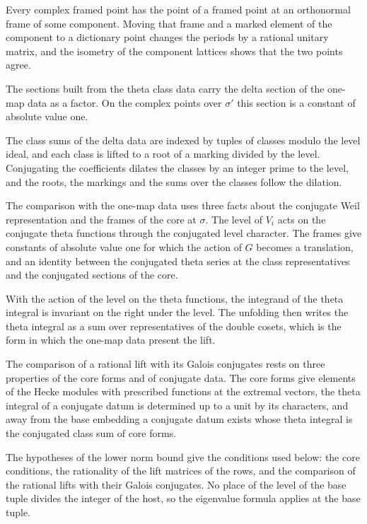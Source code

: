 Every complex framed point has the point of a framed point at an orthonormal frame of some component. Moving that
frame and a marked element of the component to a dictionary point changes the periods by a rational unitary matrix,
and the isometry of the component lattices shows that the two points agree.

The sections built from the theta class data carry the delta section of the one-map data as a factor. On
the complex points over $\sigma'$ this section is a constant of absolute value one.

The class sums of the delta data are indexed by tuples of classes modulo the level ideal, and each class is lifted to a
root of a marking divided by the level. Conjugating the coefficients dilates the classes by an integer prime to the
level, and the roots, the markings and the sums over the classes follow the dilation.

The comparison with the one-map data uses three facts about the conjugate Weil representation and the
frames of the core at $\sigma$. The level of $V_i$ acts on the conjugate theta functions through the
conjugated level character. The frames give constants of absolute value one for which the action of $G$
becomes a translation, and an identity between the conjugated theta series at the class
representatives and the conjugated sections of the core.

With the action of the level on the theta functions, the integrand of the theta integral is invariant
on the right under the level. The unfolding then writes the theta integral as a sum over
representatives of the double cosets, which is the form in which the one-map data present the lift.

The comparison of a rational lift with its Galois conjugates rests on three properties of the core
forms and of conjugate data. The core forms give elements of the Hecke modules with prescribed
functions at the extremal vectors, the theta integral of a conjugate datum is determined up to a unit
by its characters, and away from the base embedding a conjugate datum exists whose theta integral is
the conjugated class sum of core forms.

The hypotheses of the lower norm bound give the conditions used below: the core conditions, the
rationality of the lift matrices of the rows, and the comparison of the rational lifts with their
Galois conjugates. No place of the level of the base tuple divides the integer of the host, so the
eigenvalue formula applies at the base tuple.

